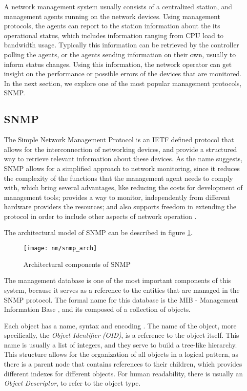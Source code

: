 \par A network management system usually consists of a centralized station, and management agents running on the network devices. Using management protocols, the
agents can report to the station information about the its operational status, which includes information ranging from CPU load to bandwidth usage. Typically this
information can be retrieved by the controller polling the agents, or the agents sending information on their own, usually to inform status changes. Using this 
information, the network operator can get insight on the performance or possible errors of the devices that are monitored. In the next section, we explore one of the
most popular management protocols, SNMP.

\subsection {SNMP}

The Simple Network Management Protocol is an IETF defined protocol that allows for the interconnection of networking devices, and provide a structured way to
retrieve relevant information about these devices. As the name suggests, SNMP allows for a simplified approach to network monitoring, since it reduces the complexity
of the functions that the management agent needs to comply with, which bring several advantages, like reducing the costs for development of management tools;
provides a way to monitor, independently from different hardware providers the resources; and also supports freedom in extending the protocol in order to include
other aspects of network operation \cite{fedor_simple_1990}.
\par The architectural model of SNMP can be described in figure \ref{fig:snmp}.
    
\begin{figure} [!htbp]
    \centering
    \texttt{[image: nm/snmp\_arch]}
    \caption{Architectural components of SNMP}
    \label{fig:snmp}
\end{figure}

The management database is one of the most important components of this system, because it serves as a reference to the entities that are managed in the SNMP
protocol. The formal name for this database is the MIB - Management Information Base \cite{rose_structure_1990}, and its composed of a collection of objects.

\par Each object has a name, syntax and encoding \cite{rose_management_1990}. The name of the object, more specifically, the \textit {Object Identifier (OID)}, is a
reference to the object itself. This name is usually a list of integers, and they serve to build a tree-like hierarchy. This structure allows for the organization 
of all objects in a logical pattern, as there is a parent node that contains references to their children, which provides different indexes for different objects. 
For human readability, there is usually an \textit {Object Descriptor}, to refer to the object type. 

